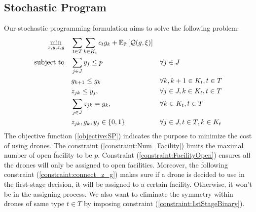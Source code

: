 \documentclass[preprint,review,11pt,authoryear]{elsarticle}
\begin{document}
\subsection{Stochastic Program}
\noindent
Our stochastic programming formulation aims to solve the following problem:
\begin{subequations}
    \begin{align}
        \min \limits_{x, y, z, g} \quad
              & \sum_{t \in T} \sum_{k \in K_t} c_t g_{k} + \mathbb{E}_{\mathbb{P}}\left[{\cal Q}(g,\xi)\right] & & \label{objective:SP}\\ 
        \operatorname{subject~to} \quad 
              & \sum_{j\in J} y_j \leq p                                             & & \forall j \in J \label{constraint:Num_Facility} \\ 
              & g_{k+1} \leq g_{k}                                                   & & \forall k, k+1 \in K_t, t \in T \label{constraint:Symmetry_Elimination} \\
              & z_{jk} \leq y_j,                                                     & &\forall j\in J, k\in  K_t, t \in T \label{constraint:FacilityOpen} \\
              & \sum_{j\in J} z_{jk} = g_{k},                                        & & \forall k\in  K_t, t \in T \label{constraint:connect_z_g} \\ 
              & z_{jk}, g_k, y_j \in \{0,1\}                                         & & \forall j \in J, t \in T, k \in K_t \label{constraint:1stStageBinary}
    \end{align}
\end{subequations}
The objective function (\ref{objective:SP}) indicates the purpose to minimize the cost of using drones. The constraint (\ref{constraint:Num_Facility}) limits the maximal number of open facility to be $p$. Constraint (\ref{constraint:FacilityOpen}) ensures all the drones will only be assigned to open facilities. Moreover, the following constraint (\ref{constraint:connect_z_g}) makes sure if a drone is decided to use in the first-stage decision, it will be assigned to a certain facility. Otherwise, it won't be in the assigning process. We also want to eliminate the symmetry within drones of same type $t \in T$ by imposing constraint (\ref{constraint:1stStageBinary}). 
\end{document}
